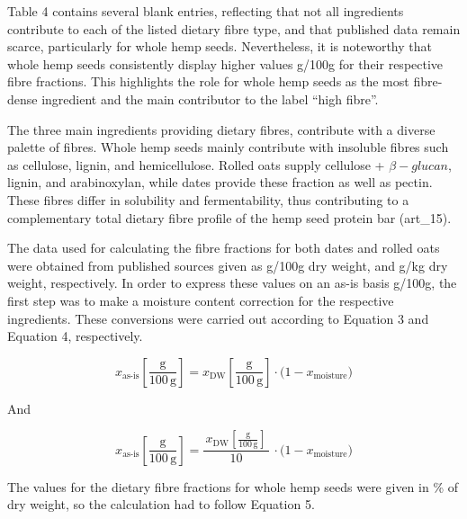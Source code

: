 \vspace{1em}
Table 4 contains several blank entries, reflecting that not all ingredients contribute to each of the listed dietary fibre type, and that published data remain scarce, particularly for whole hemp seeds. Nevertheless, it is noteworthy that whole hemp seeds consistently display higher values g/100g for their respective fibre fractions. This highlights the role for whole hemp seeds as the most fibre-dense ingredient and the main contributor to the label “high fibre”. 

\vspace{1em}
The three main ingredients providing dietary fibres, contribute with a diverse palette of fibres. Whole hemp seeds mainly contribute with insoluble fibres such as cellulose, lignin, and hemicellulose. Rolled oats supply cellulose + $\beta-glucan$, lignin, and arabinoxylan, while dates provide these fraction as well as pectin. These fibres differ in solubility and fermentability, thus contributing to a complementary total dietary fibre profile of the hemp seed protein bar (art\_15).

\vspace{1em}
The data used for calculating the fibre fractions for both dates and rolled oats were obtained from published sources given as g/100g dry weight, and g/kg dry weight, respectively. In order to express these values on an as-is basis g/100g, the first step was to make a moisture content correction for the respective ingredients. These conversions were carried out according to Equation 3 and Equation 4, respectively. 


\begin{equation}
    x_{\text{as-is}}\!\left[\frac{\mathrm{g}}{100\,\mathrm{g}}\right]
    = x_{\mathrm{DW}}\!\left[\frac{\mathrm{g}}{100\,\mathrm{g}}\right]\cdot
    \bigl(1 - x_{\text{moisture}}\bigr)
    \label{eq:asis_simple}
\end{equation}

And

\begin{equation}
    x_{\text{as-is}}\!\left[\frac{\mathrm{g}}{100\,\mathrm{g}}\right]
    = \frac{\,x_{\mathrm{DW}}\!\left[\frac{\mathrm{g}}{100\,\mathrm{g}}\right]\,}{10}\,\cdot
    \bigl(1 - x_{\text{moisture}}\bigr)
    \label{eq:asis_div10}
\end{equation}
    
The values for the dietary fibre fractions for whole hemp seeds were given in \% of dry weight, so the calculation had to follow Equation 5.     

